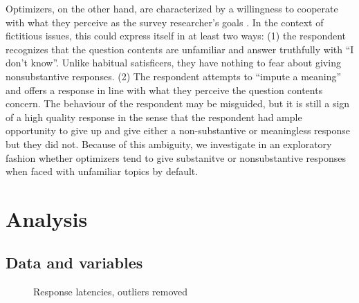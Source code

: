 \documentclass[Royal,times,sageh]{sagej}
\begin{document}
Optimizers, on the other hand, are characterized by a willingness to
cooperate with what they perceive as the survey researcher's goals
\citep{Stocke2004a}. In the context of fictitious issues, this could
express itself in at least two ways: (1) the respondent recognizes that
the question contents are unfamiliar and answer truthfully with ``I
don't know''. Unlike habitual satisficers, they have nothing to fear
about giving nonsubstantive responses. (2) The respondent attempts to
``impute a meaning'' and offers a response in line with what they
perceive the question contents concern. The behaviour of the respondent
may be misguided, but it is still a sign of a high quality response in
the sense that the respondent had ample opportunity to give up and give
either a non-substantive or meaningless response but they did not.
Because of this ambiguity, we investigate in an exploratory fashion
whether optimizers tend to give substanitve or nonsubstantive responses
when faced with unfamiliar topics by default.

\hypertarget{analysis}{%
\section{Analysis}\label{analysis}}

\hypertarget{data-and-variables}{%
\subsection{Data and variables}\label{data-and-variables}}

\begin{figure}

{\centering {}

}

\caption{\label{fig:rls}Response latencies, outliers removed}\label{fig:response-latency-plots}
\end{figure}
\end{document}
